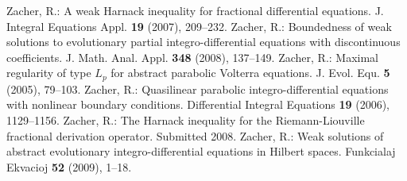 \documentclass[10pt]{article}
\begin{document}
\begin{thebibliography}{99}
{%
 Zacher, R.: A weak Harnack inequality for fractional differential equations.
J. Integral Equations Appl. {\bf 19} (2007), 209--232.
 Zacher, R.: Boundedness of weak solutions to evolutionary partial
integro-differential equations with discontinuous coefficients. J.
Math. Anal. Appl. {\bf 348} (2008), 137--149.
 Zacher, R.: Maximal regularity of type $L_p$ for
abstract parabolic Volterra equations. J. Evol. Equ. {\bf 5} (2005),
79--103.
Zacher, R.: Quasilinear parabolic integro-differential equations
with nonlinear boundary conditions.  Differential Integral Equations
{\bf 19} (2006), 1129--1156.
 Zacher, R.: The Harnack inequality for the
Riemann-Liouville fractional derivation operator. Submitted 2008.
 Zacher, R.: Weak solutions of abstract evolutionary
integro-differential equations in Hilbert spaces. Funkcialaj
Ekvacioj {\bf 52} (2009), 1--18.
}
\end{thebibliography}
\end{document}
